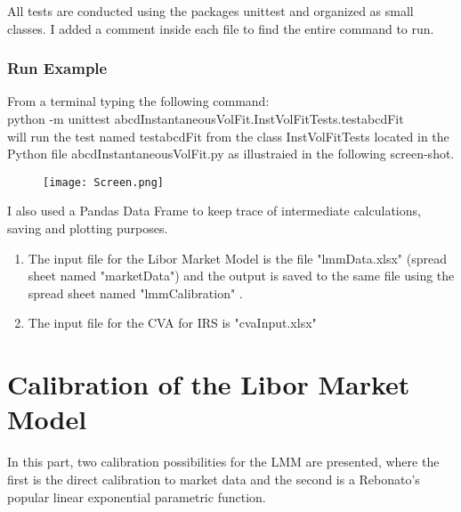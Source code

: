 \documentclass[11pt]{article}
\numberwithin{equation}{subsection}
\begin{document}
All tests are conducted using the packages unittest and organized as small classes. I added a comment inside each file to find the entire command to run.  

\subsubsection*{Run Example}
From a terminal typing the following command:\\
python -m unittest abcdInstantaneousVolFit.InstVolFitTests.testabcdFit\\
will run the test named testabcdFit from the class InstVolFitTests located in the Python file abcdInstantaneousVolFit.py as illustraied in the following screen-shot.

\begin{figure}[H]
	\texttt{[image: Screen.png]}
\end{figure}
I also used a Pandas Data Frame to keep trace of intermediate calculations, saving and plotting purposes.
\begin{enumerate}
	\item The input file for the Libor Market Model is the file "lmmData.xlsx" (spread sheet named "marketData") and the output is saved to the same file using the spread sheet named "lmmCalibration" .
	\item The input file for the CVA for IRS is "cvaInput.xlsx"
\end{enumerate}

\newpage
\section{Calibration of the Libor Market Model}
In this part, two calibration possibilities for the LMM are presented, where the first is the direct calibration to market data and the second is a Rebonato's popular linear exponential parametric function.
\end{document}

